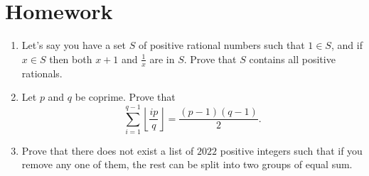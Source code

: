 \documentclass{article}
\begin{document}
\section{Homework}
  \begin{enumerate}
    \item Let's say you have a set $S$ of positive rational numbers such that
      $1\in S$, and if $x\in S$ then both $x+1$ and $\frac 1x$ are in $S$. Prove
      that $S$ contains all positive rationals.
    \item Let $p$ and $q$ be coprime. Prove that
      \[\sum_{i=1}^{q-1}\left\lfloor\frac{ip}{q}\right\rfloor=\frac{(p-1)(q-1)}2.\]
    \item Prove that there does not exist a list of $2022$ positive integers
        such that if you remove any one of them, the rest can be split into two
        groups of equal sum.
  \end{enumerate}
\end{document}
